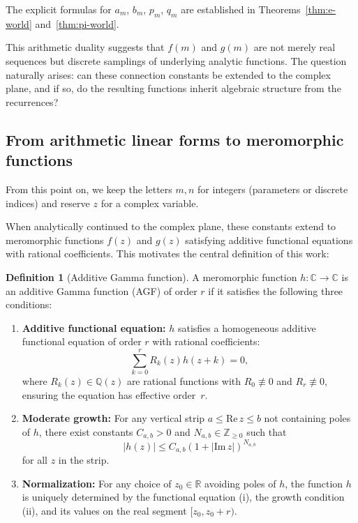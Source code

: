 \documentclass[11pt,reqno]{amsart}
\theoremstyle{definition}
\newtheorem{definition}[theorem]{Definition}
\newcommand{\N}{\mathbb{Z}_{\ge 0}}
\newcommand{\Q}{\mathbb{Q}}
\newcommand{\C}{\mathbb{C}}
\newcommand{\R}{\mathbb{R}}
\numberwithin{equation}{section}
\begin{document}
The explicit formulas for $a_m$, $b_m$, $p_m$, $q_m$ are established in Theorems~\ref{thm:e-world} and~\ref{thm:pi-world}.

This arithmetic duality suggests that $f(m)$ and $g(m)$ are not merely real sequences but discrete samplings of underlying analytic functions. The question naturally arises: can these connection constants be extended to the complex plane, and if so, do the resulting functions inherit algebraic structure from the recurrences?

\subsection{From arithmetic linear forms to meromorphic functions}

From this point on, we keep the letters $m,n$ for integers (parameters or discrete indices) and reserve $z$ for a complex variable.

When analytically continued to the complex plane, these constants extend to meromorphic functions $f(z)$ and $g(z)$ satisfying additive 
functional equations with rational coefficients. This motivates the central definition of this work:

\begin{definition}[Additive Gamma function]\label{def:AGF-intro}
A meromorphic function $h:\C\to\C$ is an additive Gamma function (AGF) of order $r$ if it satisfies the following three conditions:
\begin{enumerate}[label=(\roman*)]
\item \textbf{Additive functional equation:} $h$ satisfies a homogeneous additive functional equation of order $r$ with rational coefficients:
$$\sum_{k=0}^r R_k(z) h(z+k) = 0,$$
where $R_k(z) \in \Q(z)$ are rational functions with $R_0 \not\equiv 0$ and $R_r \not\equiv 0$, ensuring the equation has effective order~$r$.

\item \textbf{Moderate growth:} For any vertical strip $a \leq \mathrm{Re}\, z \leq b$ not containing poles of $h$, there exist constants $C_{a,b} > 0$ and $N_{a,b} \in \N$ such that
$$|h(z)| \le C_{a,b}(1+|\mathrm{Im}\, z|)^{N_{a,b}}$$
for all $z$ in the strip.

\item \textbf{Normalization:} For any choice of $z_0 \in \R$ avoiding poles of $h$, the function $h$ is uniquely determined by the functional equation (i), the growth condition (ii), and its values on the real segment $[z_0, z_0+r)$.
\end{enumerate}
\end{definition}
\end{document}
